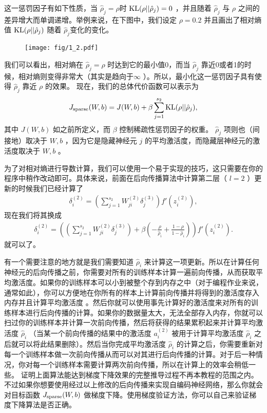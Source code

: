 这一惩罚因子有如下性质，当 $ \hat\rho_j = \rho $时 $ {\rm KL}(\rho || \hat\rho_j) = 0$ ，并且随着 $ \hat\rho_j $ 与 $ \rho$ 之间的差异增大而单调递增。举例来说，在下图中，我们设定 $ \rho = 0.2$ 并且画出了相对熵值 $ {\rm KL}(\rho || \hat\rho_j)$ 随着 $ \hat\rho_j $变化的变化。

\begin{figure}[H]
\centering
\texttt{[image: fig/1\_2.pdf]}
\end{figure}

我们可以看出，相对熵在 $ \hat\rho_j = \rho$  时达到它的最小值0，而当 $ \hat\rho_j $ 靠近0或者1的时候，相对熵则变得非常大（其实是趋向于$ \infty$ ）。所以，最小化这一惩罚因子具有使得 $ \hat\rho_j$  靠近 $ \rho $ 的效果。 现在，我们的总体代价函数可以表示为
\begin{align}
J_{\rm sparse}(W,b) = J(W,b) + \beta \sum_{j=1}^{s_2} {\rm KL}(\rho || \hat\rho_j),
\nonumber \end{align}
其中 $ J(W,b) $ 如之前所定义，而 $ \beta $ 控制稀疏性惩罚因子的权重。 $ \hat\rho_j $ 项则也（间接地）取决于 $ W,b$  ，因为它是隐藏神经元 $ j $ 的平均激活度，而隐藏层神经元的激活度取决于 $ W,b $ 。

为了对相对熵进行导数计算，我们可以使用一个易于实现的技巧，这只需要在你的程序中稍作改动即可。具体来说，前面在后向传播算法中计算第二层（ $ l=2$  ）更新的时候我们已经计算了
\begin{align}
\delta^{(2)}_i = \left( \sum_{j=1}^{s_{2}} W^{(2)}_{ji} \delta^{(3)}_j \right) f'(z^{(2)}_i),
\nonumber \end{align}
现在我们将其换成
\begin{align}
\delta^{(2)}_i =
  \left( \left( \sum_{j=1}^{s_{2}} W^{(2)}_{ji} \delta^{(3)}_j \right)
+ \beta \left( - \frac{\rho}{\hat\rho_i} + \frac{1-\rho}{1-\hat\rho_i} \right) \right) f'(z^{(2)}_i) .
\nonumber \end{align}
就可以了。

有一个需要注意的地方就是我们需要知道 $ \hat\rho_i $ 来计算这一项更新。所以在计算任何神经元的后向传播之前，你需要对所有的训练样本计算一遍前向传播，从而获取平均激活度。如果你的训练样本可以小到被整个存到内存之中（对于编程作业来说，通常如此），你可以方便地在你所有的样本上计算前向传播并将得到的激活度存入内存并且计算平均激活度 。然后你就可以使用事先计算好的激活度来对所有的训练样本进行后向传播的计算。如果你的数据量太大，无法全部存入内存，你就可以扫过你的训练样本并计算一次前向传播，然后将获得的结果累积起来并计算平均激活度 $ \hat\rho_i $ （当某一个前向传播的结果中的激活度 $ a^{(2)}_i$  被用于计算平均激活度 $ \hat\rho_i$  之后就可以将此结果删除）。然后当你完成平均激活度 $ \hat\rho_i$  的计算之后，你需要重新对每一个训练样本做一次前向传播从而可以对其进行后向传播的计算。对于后一种情况，你对每一个训练样本需要计算两次前向传播，所以在计算上的效率会稍低一些。
证明上面算法能达到梯度下降效果的完整推导过程不再本教程的范围之内。不过如果你想要使用经过以上修改的后向传播来实现自编码神经网络，那么你就会对目标函数 $ J_{\rm sparse}(W,b)$  做梯度下降。使用梯度验证方法，你可以自己来验证梯度下降算法是否正确。

